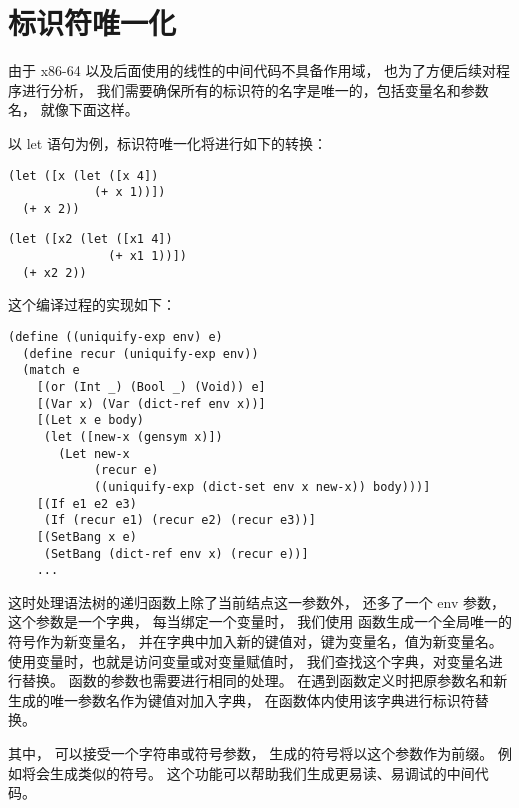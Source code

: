 
\section{标识符唯一化}

由于 x86-64 以及后面使用的线性的中间代码不具备作用域，
也为了方便后续对程序进行分析，
我们需要确保所有的标识符的名字是唯一的，包括变量名和参数名，
就像下面这样。

以 let 语句为例，标识符唯一化将进行如下的转换：
\begin{transformation}
\begin{lstlisting}
(let ([x (let ([x 4])
            (+ x 1))])
  (+ x 2))
\end{lstlisting}
\compilesto
\begin{lstlisting}
(let ([x2 (let ([x1 4])
              (+ x1 1))])
  (+ x2 2))
\end{lstlisting}
\end{transformation}

这个编译过程的实现如下：

\begin{lstlisting}
(define ((uniquify-exp env) e)
  (define recur (uniquify-exp env))
  (match e
    [(or (Int _) (Bool _) (Void)) e]
    [(Var x) (Var (dict-ref env x))]
    [(Let x e body)
     (let ([new-x (gensym x)])
       (Let new-x
            (recur e)
            ((uniquify-exp (dict-set env x new-x)) body)))]
    [(If e1 e2 e3)
     (If (recur e1) (recur e2) (recur e3))]
    [(SetBang x e)
     (SetBang (dict-ref env x) (recur e))]
    ...
\end{lstlisting}

这时处理语法树的递归函数上除了当前结点这一参数外，
还多了一个 env 参数，这个参数是一个字典，
每当绑定一个变量时，
我们使用  函数生成一个全局唯一的符号作为新变量名，
并在字典中加入新的键值对，键为变量名，值为新变量名。
使用变量时，也就是访问变量或对变量赋值时，
我们查找这个字典，对变量名进行替换。
函数的参数也需要进行相同的处理。
在遇到函数定义时把原参数名和新生成的唯一参数名作为键值对加入字典，
在函数体内使用该字典进行标识符替换。

其中， 可以接受一个字符串或符号参数，
生成的符号将以这个参数作为前缀。
例如将会生成类似的符号。
这个功能可以帮助我们生成更易读、易调试的中间代码。
